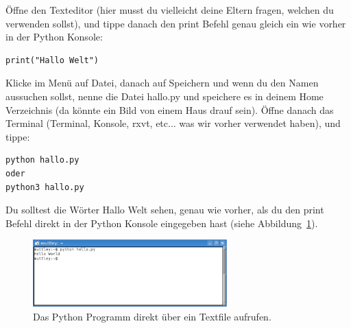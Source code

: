 \begin{LINUX}
Öffne den Texteditor (hier musst du vielleicht deine Eltern fragen, welchen du verwenden sollst), und tippe danach den print Befehl genau gleich ein wie vorher in der Python Konsole:

\begin{Verbatim}[frame=single]
print("Hallo Welt")
\end{Verbatim}

Klicke im Menü auf Datei, danach auf Speichern und wenn du den Namen aussuchen sollst, nenne die Datei hallo.py und speichere es in deinem Home Verzeichnis (da könnte ein Bild von einem Haus drauf sein). Öffne danach das Terminal (Terminal, Konsole, rxvt, etc... was wir vorher verwendet haben), und tippe:

\begin{Verbatim}[frame=single]
python hallo.py
oder
python3 hallo.py
\end{Verbatim}

Du solltest die Wörter Hallo Welt sehen, genau wie vorher, als du den print Befehl direkt in der Python Konsole eingegeben hast (siehe Abbildung~\ref{fig9}).

\begin{figure}
\begin{center}
\includegraphics[width=75mm]{images/figure9}
\end{center}
\caption{Das Python Programm direkt über ein Textfile aufrufen.}\label{fig9}
\end{figure}
\end{LINUX}

